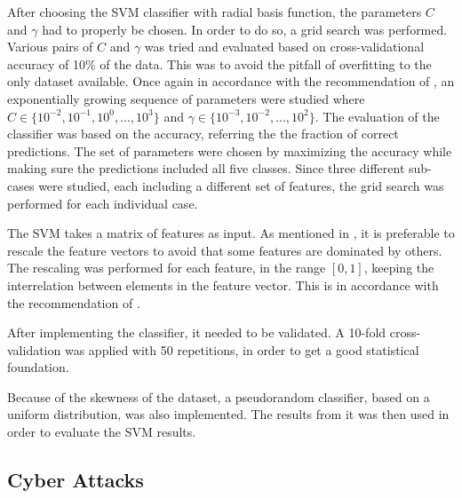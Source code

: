 After choosing the SVM classifier with radial basis function, the parameters $C$ and $\gamma$ had to properly be chosen. In order to do so, a grid search was performed. Various pairs of $C$ and $\gamma$ was tried and evaluated based on cross-validational accuracy of 10\% of the data. This was to avoid the pitfall of overfitting to the only dataset available. Once again in accordance with the recommendation of \citet{Hsu10apractical}, an exponentially growing sequence of parameters were studied where $C\in\{10^{-2},10^{-1},10^{0},...,10^{3}\}$ and $\gamma\in\{10^{-3},10^{-2},...,10^{2}\}$. The evaluation of the classifier was based on the accuracy, referring the the fraction of correct predictions. The set of parameters were chosen by maximizing the accuracy while making sure the predictions included all five classes. Since three different sub-cases were studied, each including a different set of features, the grid search was performed for each individual case. 

The SVM takes a matrix of features as input. As mentioned in , it is preferable to rescale the feature vectors to avoid that some features are dominated by others. The rescaling was performed for each feature, in the range $[0,1]$, keeping the interrelation between elements in the feature vector. This is in accordance with the recommendation of \citet{Hsu10apractical}.

After implementing the classifier, it needed to be validated. A 10-fold cross-validation was applied with 50 repetitions, in order to get a good statistical foundation.

Because of the skewness of the dataset, a pseudorandom classifier, based on a uniform distribution, was also implemented.  The results from it was then used in order to evaluate the SVM results. 

\subsection{Cyber Attacks}\label{cyberattacks}



\newpage 
